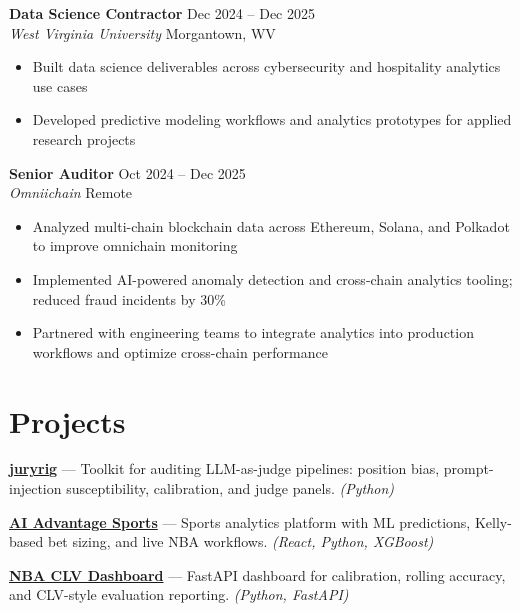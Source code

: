 \documentclass[11pt,letterpaper]{article}
\newcommand{\resumeitem}[1]{\item[\textbullet] #1}
\begin{document}
\vspace{4pt}

\textbf{Data Science Contractor} \hfill Dec 2024 -- Dec 2025 \\
\textit{West Virginia University} \hfill Morgantown, WV
\begin{itemize}[nosep, leftmargin=16pt, topsep=2pt]
    \resumeitem{Built data science deliverables across cybersecurity and hospitality analytics use cases}
    \resumeitem{Developed predictive modeling workflows and analytics prototypes for applied research projects}
\end{itemize}

\vspace{4pt}

\textbf{Senior Auditor} \hfill Oct 2024 -- Dec 2025 \\
\textit{Omniichain} \hfill Remote
\begin{itemize}[nosep, leftmargin=16pt, topsep=2pt]
    \resumeitem{Analyzed multi-chain blockchain data across Ethereum, Solana, and Polkadot to improve omnichain monitoring}
    \resumeitem{Implemented AI-powered anomaly detection and cross-chain analytics tooling; reduced fraud incidents by 30\%}
    \resumeitem{Partnered with engineering teams to integrate analytics into production workflows and optimize cross-chain performance}
\end{itemize}

\section{Projects}

\textbf{\href{https://github.com/ianalloway/juryrig}{juryrig}} --- Toolkit for auditing LLM-as-judge pipelines: position bias, prompt-injection susceptibility, calibration, and judge panels. \textit{(Python)}

\vspace{3pt}

\textbf{\href{https://aiadvantagesports.com}{AI Advantage Sports}} --- Sports analytics platform with ML predictions, Kelly-based bet sizing, and live NBA workflows. \textit{(React, Python, XGBoost)}

\vspace{3pt}

\textbf{\href{https://github.com/ianalloway/nba-clv-dashboard}{NBA CLV Dashboard}} --- FastAPI dashboard for calibration, rolling accuracy, and CLV-style evaluation reporting. \textit{(Python, FastAPI)}
\end{document}
